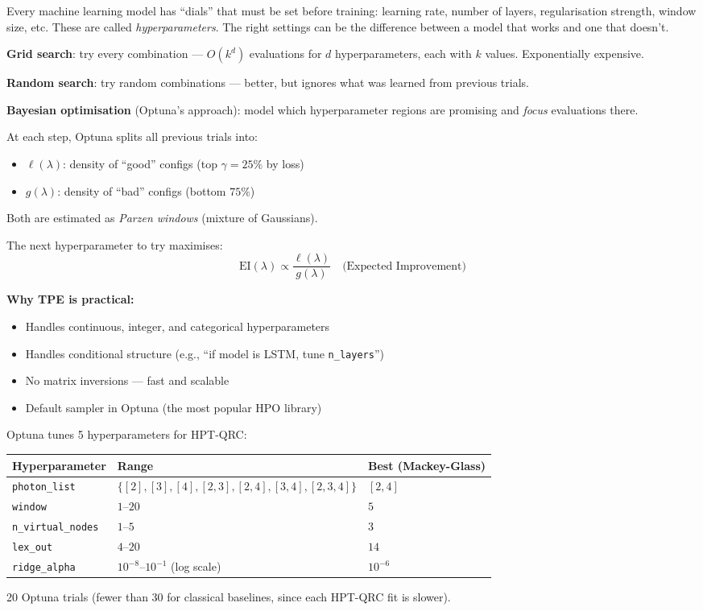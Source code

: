 \documentclass[11pt]{article}
\newcommand{\concept}[2]{%
  \begin{tcolorbox}[conceptbox, title={#1}]
  #2
  \end{tcolorbox}
}
\newcommand{\mathblock}[2]{%
  \begin{tcolorbox}[mathbox, title={Math: #1}]
  #2
  \end{tcolorbox}
}
\newcommand{\example}[2]{%
  \begin{tcolorbox}[examplebox, title={Concrete Example: #1}]
  #2
  \end{tcolorbox}
}
\begin{document}
\concept{Hyperparameter Optimisation --- Why it Matters}{
Every machine learning model has ``dials'' that must be set before training:
learning rate, number of layers, regularisation strength, window size, etc.
These are called \emph{hyperparameters}. The right settings can be the
difference between a model that works and one that doesn't.

\textbf{Grid search}: try every combination --- $O(k^d)$ evaluations for
$d$ hyperparameters, each with $k$ values. Exponentially expensive.

\textbf{Random search}: try random combinations --- better, but ignores
what was learned from previous trials.

\textbf{Bayesian optimisation} (Optuna's approach): model which
hyperparameter regions are promising and \emph{focus} evaluations there.
}

\mathblock{TPE --- Tree-structured Parzen Estimator}{
At each step, Optuna splits all previous trials into:
\begin{itemize}
  \item $\ell(\lambda)$: density of ``good'' configs (top $\gamma = 25\%$ by loss)
  \item $g(\lambda)$: density of ``bad'' configs (bottom $75\%$)
\end{itemize}
Both are estimated as \emph{Parzen windows} (mixture of Gaussians).

The next hyperparameter to try maximises:
\[
  \text{EI}(\lambda) \propto \frac{\ell(\lambda)}{g(\lambda)}
  \quad \text{(Expected Improvement)}
\]

\textbf{Why TPE is practical:}
\begin{itemize}
  \item Handles continuous, integer, and categorical hyperparameters
  \item Handles conditional structure (e.g., ``if model is LSTM, tune
        \texttt{n\_layers}'')
  \item No matrix inversions --- fast and scalable
  \item Default sampler in Optuna (the most popular HPO library)
\end{itemize}
}

\example{HPT-QRC Hyperparameter Search Space}{
Optuna tunes 5 hyperparameters for HPT-QRC:
\begin{center}
\begin{tabular}{lll}
\toprule
Hyperparameter & Range & Best (Mackey-Glass) \\
\midrule
\texttt{photon\_list} & $\{[2],[3],[4],[2,3],[2,4],[3,4],[2,3,4]\}$ & $[2,4]$ \\
\texttt{window} & $1$--$20$ & $5$ \\
\texttt{n\_virtual\_nodes} & $1$--$5$ & $3$ \\
\texttt{lex\_out} & $4$--$20$ & $14$ \\
\texttt{ridge\_alpha} & $10^{-8}$--$10^{-1}$ (log scale) & $10^{-6}$ \\
\bottomrule
\end{tabular}
\end{center}
20 Optuna trials (fewer than 30 for classical baselines, since each
HPT-QRC fit is slower).
}
\end{document}
